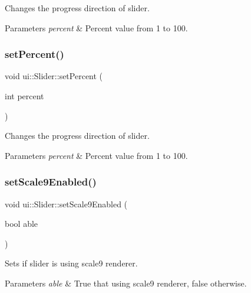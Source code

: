 Changes the progress direction of slider. 
\begin{DoxyParams}{Parameters}
{\em percent} & Percent value from 1 to 100. \\
\hline
\end{DoxyParams}
\mbox{\label{classui_1_1Slider_a720aa3007f2716699790494cd6731c6c}} 
\subsubsection{\texorpdfstring{set\+Percent()}{setPercent()}\hspace{0.1cm}{\footnotesize\ttfamily [2/2]}}
{\footnotesize\ttfamily void ui\+::\+Slider\+::set\+Percent (\begin{DoxyParamCaption}\item[{int}]{percent }\end{DoxyParamCaption})}

Changes the progress direction of slider. 
\begin{DoxyParams}{Parameters}
{\em percent} & Percent value from 1 to 100. \\
\hline
\end{DoxyParams}
\mbox{\label{classui_1_1Slider_a5bde7358258d6ad46027d92dd0bfa2ca}} 
\subsubsection{\texorpdfstring{set\+Scale9\+Enabled()}{setScale9Enabled()}\hspace{0.1cm}{\footnotesize\ttfamily [1/2]}}
{\footnotesize\ttfamily void ui\+::\+Slider\+::set\+Scale9\+Enabled (\begin{DoxyParamCaption}\item[{bool}]{able }\end{DoxyParamCaption})}

Sets if slider is using scale9 renderer. 
\begin{DoxyParams}{Parameters}
{\em able} & True that using scale9 renderer, false otherwise. \\
\hline
\end{DoxyParams}
\mbox{\label{classui_1_1Slider_a5bde7358258d6ad46027d92dd0bfa2ca}} 
